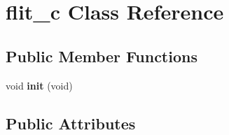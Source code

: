 \hypertarget{classflit__c}{
\section{flit\_\-c Class Reference}
\label{classflit__c}
}
\subsection*{Public Member Functions}
\begin{DoxyCompactItemize}
\item 
\hypertarget{classflit__c_ab9a66ece944373581bea42fcc7942258}{
void {\bfseries init} (void)}
\label{classflit__c_ab9a66ece944373581bea42fcc7942258}

\end{DoxyCompactItemize}
\subsection*{Public Attributes}
